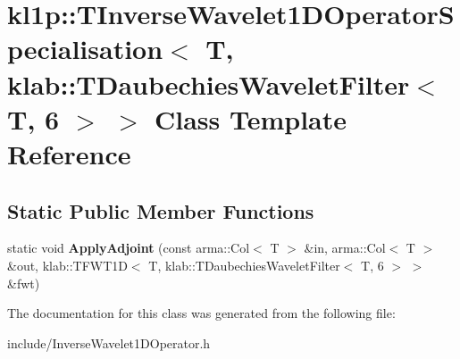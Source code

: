 \hypertarget{classkl1p_1_1TInverseWavelet1DOperatorSpecialisation_3_01T_00_01klab_1_1TDaubechiesWaveletFilter_3_01T_00_016_01_4_01_4}{}\section{kl1p\+:\+:T\+Inverse\+Wavelet1\+D\+Operator\+Specialisation$<$ T, klab\+:\+:T\+Daubechies\+Wavelet\+Filter$<$ T, 6 $>$ $>$ Class Template Reference}
\label{classkl1p_1_1TInverseWavelet1DOperatorSpecialisation_3_01T_00_01klab_1_1TDaubechiesWaveletFilter_3_01T_00_016_01_4_01_4}
\subsection*{Static Public Member Functions}
\begin{DoxyCompactItemize}
\item 
static void {\bfseries Apply\+Adjoint} (const arma\+::\+Col$<$ T $>$ \&in, arma\+::\+Col$<$ T $>$ \&out, klab\+::\+T\+F\+W\+T1D$<$ T, klab\+::\+T\+Daubechies\+Wavelet\+Filter$<$ T, 6 $>$ $>$ \&fwt)\hypertarget{classkl1p_1_1TInverseWavelet1DOperatorSpecialisation_3_01T_00_01klab_1_1TDaubechiesWaveletFilter_3_01T_00_016_01_4_01_4_aac88db4110c0a6b10a01fb7d8e385916}{}\label{classkl1p_1_1TInverseWavelet1DOperatorSpecialisation_3_01T_00_01klab_1_1TDaubechiesWaveletFilter_3_01T_00_016_01_4_01_4_aac88db4110c0a6b10a01fb7d8e385916}

\end{DoxyCompactItemize}


The documentation for this class was generated from the following file\+:\begin{DoxyCompactItemize}
\item 
include/Inverse\+Wavelet1\+D\+Operator.\+h\end{DoxyCompactItemize}
